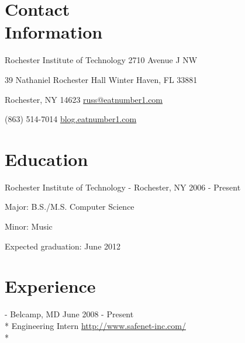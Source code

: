 \documentclass[a4paper,margin,line]{resume}
\newcommand{\rurl}[1]{\hfill {\footnotesize \url{#1}}}
\newcommand{\rdate}[1]{\hfill {\small #1}}
\renewcommand{\employer}[5]{\item[#1] - #2 \rdate{#3} \\* #4 \rurl{#5} \\*}
\begin{document}
\begin{resume}
\section{\mysidestyle Contact \\ Information} \vspace{2mm}
	\begin{asparablank}
		\item Rochester Institute of Technology \hfill 2710 Avenue J NW
		\item 39 Nathaniel Rochester Hall \hfill Winter Haven, FL 33881
		\item Rochester, NY 14623 \hfill \href{mailto:russ@eatnumber1.com}{russ@eatnumber1.com}
		\item (863) 514-7014 \hfill
		\href{http://blog.eatnumber1.com/}{blog.eatnumber1.com}
	\end{asparablank}

\section{\mysidestyle Education}
	\begin{compactdesc}
		\item[Rochester Institute of Technology] - Rochester, NY \rdate{2006 - Present}
		\begin{compactitem} { \small
			\item Major: B.S./M.S. Computer Science
			\item Minor: Music
			\item Expected graduation: June 2012
		} \end{compactitem}
	\end{compactdesc}

\section{\mysidestyle Experience}
	\begin{asparadesc}
		\employer{SafeNet Inc}{Belcamp, MD}{June 2008 - Present}{Engineering
		Intern}{http://www.safenet-inc.com/}


\end{asparadesc}
\end{resume}
\end{document}
